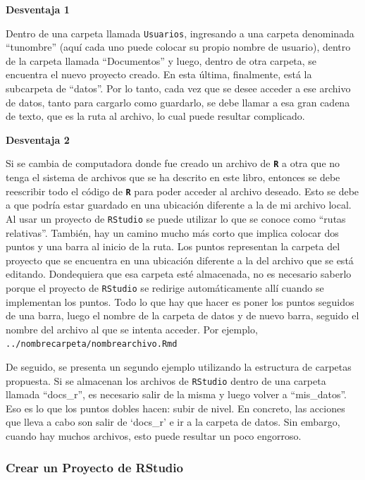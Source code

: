 \documentclass[
]{article}
\begin{document}
\textbf{Desventaja 1}

Dentro de una carpeta llamada \texttt{Usuarios}, ingresando a una carpeta denominada ``tunombre'' (aquí cada uno puede colocar su propio nombre de usuario), dentro de la carpeta llamada ``Documentos'' y luego, dentro de otra carpeta, se encuentra el nuevo proyecto creado. En esta última, finalmente, está la subcarpeta de ``datos''. Por lo tanto, cada vez que se desee acceder a ese archivo de datos, tanto para cargarlo como guardarlo, se debe llamar a esa gran cadena de texto, que es la ruta al archivo, lo cual puede resultar complicado.

\textbf{Desventaja 2}

Si se cambia de computadora donde fue creado un archivo de \textbf{\texttt{R}} a otra que no tenga el sistema de archivos que se ha descrito en este libro, entonces se debe reescribir todo el código de \textbf{\texttt{R}} para poder acceder al archivo deseado. Esto se debe a que podría estar guardado en una ubicación diferente a la de mi archivo local. Al usar un proyecto de \texttt{RStudio} se puede utilizar lo que se conoce como ``rutas relativas''. También, hay un camino mucho más corto que implica colocar dos puntos y una barra al inicio de la ruta. Los puntos representan la carpeta del proyecto que se encuentra en una ubicación diferente a la del archivo que se está editando. Dondequiera que esa carpeta esté almacenada, no es necesario saberlo porque el proyecto de \texttt{RStudio} se redirige automáticamente allí cuando se implementan los puntos. Todo lo que hay que hacer es poner los puntos seguidos de una barra, luego el nombre de la carpeta de datos y de nuevo barra, seguido el nombre del archivo al que se intenta acceder. Por ejemplo, \texttt{../nombrecarpeta/nombrearchivo.Rmd}

De seguido, se presenta un segundo ejemplo utilizando la estructura de carpetas propuesta. Si se almacenan los archivos de \texttt{RStudio} dentro de una carpeta llamada ``docs\_r'', es necesario salir de la misma y luego volver a ``mis\_datos''. Eso es lo que los puntos dobles hacen: subir de nivel. En concreto, las acciones que lleva a cabo son salir de `docs\_r' e ir a la carpeta de datos. Sin embargo, cuando hay muchos archivos, esto puede resultar un poco engorroso.

\hypertarget{crear-un-proyecto-de-rstudio}{%
\subsubsection{Crear un Proyecto de RStudio}\label{crear-un-proyecto-de-rstudio}}
\end{document}
